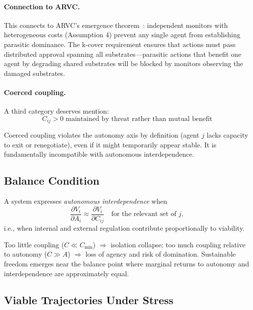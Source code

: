 \documentclass[11pt,a4paper]{article}
\begin{document}
\paragraph{Connection to ARVC.} This connects to ARVC's emergence theorem~\cite{arvc}: independent monitors with heterogeneous costs (Assumption 4) prevent any single agent from establishing parasitic dominance. The k-cover requirement ensures that actions must pass distributed approval spanning all substrates---parasitic actions that benefit one agent by degrading shared substrates will be blocked by monitors observing the damaged substrates.

\paragraph{Coerced coupling.} A third category deserves mention:
\begin{equation}
C_{ij} > 0 \text{ maintained by threat rather than mutual benefit}
\end{equation}

Coerced coupling violates the autonomy axis by definition (agent $j$ lacks capacity to exit or renegotiate), even if it might temporarily appear stable. It is fundamentally incompatible with autonomous interdependence.

\subsection{Balance Condition}

A system expresses \emph{autonomous interdependence} when
\begin{equation}
  \frac{\partial V_i}{\partial A_i} \approx \frac{\partial V_i}{\partial C_{ij}} \quad \text{for the relevant set of } j,
  \label{eq:balance}
\end{equation}
i.e., when internal and external regulation contribute proportionally to viability. 

Too little coupling ($C \ll C_{\min}$) $\Rightarrow$ isolation collapse; too much coupling relative to autonomy ($C \gg A$) $\Rightarrow$ loss of agency and risk of domination. Sustainable freedom emerges near the balance point where marginal returns to autonomy and interdependence are approximately equal.

\subsection{Viable Trajectories Under Stress}
\end{document}
